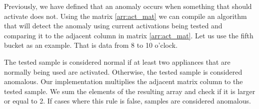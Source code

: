 Previously, we have defined that an anomaly occurs when something that should activate does not.
Using the matrix \ref{arr:act_mat} we can compile an algorithm that will detect the anomaly using current activations being tested 
and comparing it to the adjacent column in matrix \ref{arr:act_mat}.
Let us use the fifth bucket as an example. That is data from 8 to 10 o'clock.

The tested sample is considered normal if at least two appliances that are normally being used are activated.
Otherwise, the tested sample is considered anomalous.
Our implementation multiplies the adjacent matrix column to the tested sample.
We sum the elements of the resulting array and check if it is larger or equal to 2.
If cases where this rule is false, samples are considered anomalous.

\begin{figure}[H]
\end{figure}
